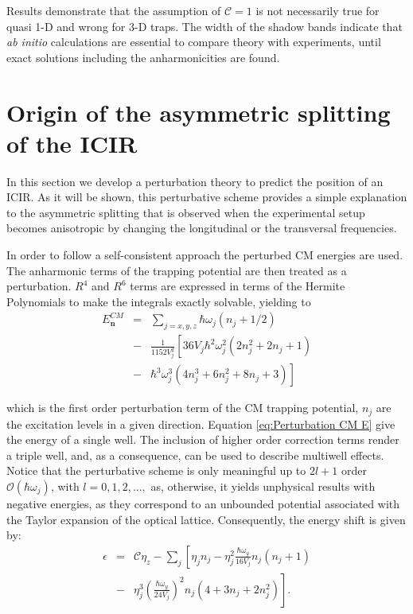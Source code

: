 \documentclass[aps,pre,twocolumn,superscriptaddress,showpacs]{revtex4-1}
\newcommand{\bfeq}[1]{{\boldsymbol{#1}}}
\begin{document}
Results demonstrate that the assumption of $\mathcal{C}=1$ is not necessarily true for quasi 1-D and wrong for 3-D traps. The width of the shadow bands indicate that \textit{ab initio} calculations are essential to compare theory with experiments, until exact solutions including the anharmonicities are found.
\section{Origin of the asymmetric splitting of the ICIR} \label{sec:perturbation}
In this section we develop a perturbation theory to predict the position of an ICIR. As it will be shown, this perturbative scheme provides a simple explanation to the asymmetric splitting that is observed when the experimental setup becomes anisotropic by changing the longitudinal or the transversal frequencies. 

In order to follow a self-consistent approach the perturbed CM energies are used. The anharmonic terms of the trapping potential are then treated as a perturbation. $R^4$ and $R^6$ terms are expressed in terms of the Hermite Polynomials to make the integrals exactly solvable, yielding to
\begin{eqnarray}
E^{CM}_{\bfeq{n}} &=& \sum_{j=x,y,z} \hbar \omega_j(n_j + 1/2) \nonumber \\ 
&-& \frac{1}{1152V^2_j} \left[ 36V_j\hbar^2\omega^2_j(2n^2_j + 2n_j + 1) \right. \nonumber \\
&-&\left. \hbar^3 \omega^3_j (4n^3_j + 6n^2_j + 8n_j + 3)\right]
\label{eq:Perturbation CM E}
\end{eqnarray}

which is the first order perturbation term of the CM trapping potential, $n_j$ are the excitation levels in a given direction. Equation \eqref{eq:Perturbation CM E} give the energy of a single well. The inclusion of higher order correction terms render a triple well, and, as a consequence, can be used to describe multiwell effects. Notice that the perturbative scheme is only meaningful up to $2l+1$ order $\mathcal{O}(\hbar \omega_j)$, with $l = 0,1,2,...,$ as, otherwise, it yields unphysical results with negative energies, as they correspond to an unbounded potential associated with the Taylor expansion of the optical lattice. Consequently, the energy shift is given by:
\begin{eqnarray}
\epsilon &=& \mathcal{C} \eta_z - \sum_j \left[  \eta_j n_j - \eta^2_j \frac{\hbar \omega_y}{16V_j}n_j(n_j+1) \right. \nonumber \\
 &-&\left. \eta^3_j \left(\frac{\hbar \omega_y}{24V_j}\right)^2 n_j(4 + 3n_j + 2n^2_j)\right].
\label{eq:Perturbation shift}
\end{eqnarray}
\end{document}
